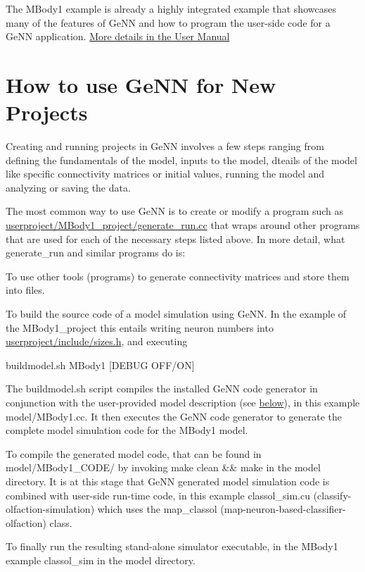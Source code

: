 The M\+Body1 example is already a highly integrated example that showcases many of the features of Ge\+N\+N and how to program the user-\/side code for a Ge\+N\+N application. \hyperlink{}{More details in the User Manual }\hypertarget{Quickstart_sec_how_to}{}\section{How to use Ge\+N\+N for New Projects}\label{Quickstart_sec_how_to}
Creating and running projects in Ge\+N\+N involves a few steps ranging from defining the fundamentals of the model, inputs to the model, dteails of the model like specific connectivity matrices or initial values, running the model and analyzing or saving the data.

The most common way to use Ge\+N\+N is to create or modify a program such as {\ttfamily \hyperlink{userproject_2MBody1__project_2generate__run_8cc}{userproject/\+M\+Body1\+\_\+project/generate\+\_\+run.\+cc}} that wraps around other programs that are used for each of the necessary steps listed above. In more detail, what {\ttfamily generate\+\_\+run} and similar programs do is\+:


\begin{DoxyEnumerate}
\item To use other tools (programs) to generate connectivity matrices and store them into files.
\item To build the source code of a model simulation using Ge\+N\+N. In the example of the M\+Body1\+\_\+project this entails writing neuron numbers into {\ttfamily \hyperlink{sizes_8h}{userproject/include/sizes.\+h}}, and executing 
\begin{DoxyCode}
buildmodel.sh MBody1 [DEBUG OFF/ON]
\end{DoxyCode}
 The {\ttfamily buildmodel.\+sh} script compiles the installed Ge\+N\+N code generator in conjunction with the user-\/provided model description (see \hyperlink{Quickstart_sec_ownmodel}{below}), in this example {\ttfamily model/\+M\+Body1.\+cc}. It then executes the Ge\+N\+N code generator to generate the complete model simulation code for the M\+Body1 model.
\item To compile the generated model code, that can be found in {\ttfamily model/\+M\+Body1\+\_\+\+C\+O\+D\+E/} by invoking {\ttfamily make clean \&\& make} in the {\ttfamily model} directory. It is at this stage that Ge\+N\+N generated model simulation code is combined with user-\/side run-\/time code, in this example {\ttfamily classol\+\_\+sim.\+cu} (classify-\/olfaction-\/simulation) which uses the {\ttfamily map\+\_\+classol} (map-\/neuron-\/based-\/classifier-\/olfaction) class.
\item To finally run the resulting stand-\/alone simulator executable, in the M\+Body1 example {\ttfamily classol\+\_\+sim} in the {\ttfamily model} directory.
\end{DoxyEnumerate}

